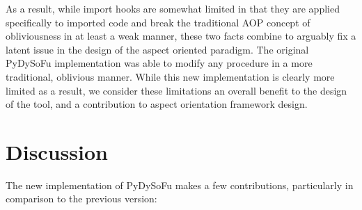     
As a result, while import hooks are somewhat limited in that they are applied
specifically to imported code and break the traditional AOP concept of
obliviousness in at least a weak manner, these two facts combine to arguably fix
a latent issue in the design of the aspect oriented paradigm. The original
PyDySoFu implementation was able to modify any procedure in a more traditional,
oblivious manner. While this new implementation is clearly more limited as a
result, we consider these limitations an overall benefit to the design of the
tool, and a contribution to aspect orientation framework design.






\section{Discussion}

The new implementation of PyDySoFu makes a few contributions, particularly in
comparison to the previous version:

